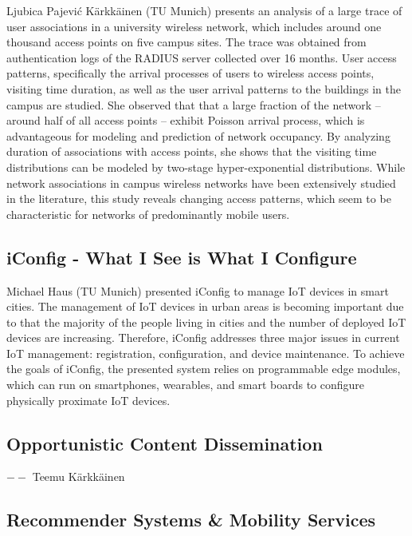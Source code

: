 Ljubica Pajević Kärkkäinen (TU Munich) presents an analysis of a large trace
of user associations in a university wireless network, which includes around
one thousand access points on five campus sites. The trace was obtained from
authentication logs of the RADIUS server collected over 16 months.  User
access patterns, specifically the arrival processes of users to wireless
access points, visiting time duration, as well as the user arrival patterns to
the buildings in the campus are studied. She observed that that a large
fraction of the network -- around half of all access points -- exhibit Poisson
arrival process, which is advantageous for modeling and prediction of network
occupancy. By analyzing duration of associations with access points, she shows
that the visiting time distributions can be modeled by two-stage
hyper-exponential distributions.  While network associations in campus
wireless networks have been extensively studied in the literature, this study
reveals changing access patterns, which seem to be characteristic for networks
of predominantly mobile users.

\subsection{iConfig - What I See is What I Configure}

Michael Haus (TU Munich) presented iConfig to manage \ac{IoT} devices in smart
cities. The management of \ac{IoT} devices in urban areas is becoming
important due to that the majority of the people living in cities and the
number of deployed \ac{IoT} devices are increasing. Therefore, iConfig
addresses three major issues in current \ac{IoT} management: registration,
configuration, and device maintenance. To achieve the goals of iConfig, the
presented system relies on programmable edge modules, which can run on
smartphones, wearables, and smart boards to configure physically proximate
\ac{IoT} devices.


\subsection{Opportunistic Content Dissemination}
$--$ Teemu Kärkkäinen


\subsection{Recommender Systems \& Mobility Services}

